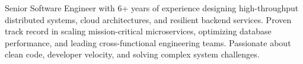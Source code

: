 Senior Software Engineer with 6+ years of experience designing high-throughput distributed systems, cloud architectures, and resilient backend services. Proven track record in scaling mission-critical microservices, optimizing database performance, and leading cross-functional engineering teams. Passionate about clean code, developer velocity, and solving complex system challenges.
